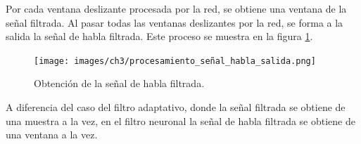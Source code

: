 Por cada ventana deslizante procesada por la red, se obtiene una ventana de la señal filtrada. Al pasar todas las ventanas deslizantes por la red, se forma a la salida la señal de habla filtrada. Este proceso se muestra en la figura \ref{fig:ch3_procesamiento_señal_habla_salida}.

\begin{figure}[H]
	\centering
	\centerline{\texttt{[image: images/ch3/procesamiento\_señal\_habla\_salida.png]}}
	\caption{Obtención de la señal de habla filtrada.}
	\label{fig:ch3_procesamiento_señal_habla_salida}
\end{figure}

A diferencia del caso del filtro adaptativo, donde la señal filtrada se obtiene de una muestra a la vez, en el filtro neuronal la señal de habla filtrada se obtiene de una ventana a la vez.
